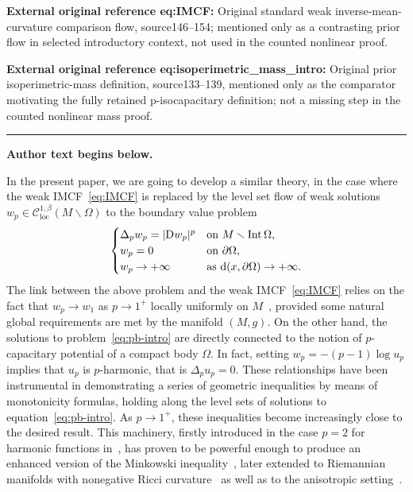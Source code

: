 \documentclass[11pt]{article}
\numberwithin{equation}{section}
\newcommand{\dist}{\mathrm{d}}
\newcommand{\D}{\mathrm{D}\kern.01cm}
\newcommand{\CS}{\mathscr{C}}
\DeclareMathOperator{\Int}{Int}
\DeclareMathOperator{\loc}{loc}
\DeclarePairedDelimiter{\sigmaAbs}{\lvert}{\rvert}
\newcommand{\abs}[1]{\ifstrempty{#1}{\sigmaAbs{\kern1pt\cdot\kern1pt}}{\mathchoice{\sigmaAbs*{#1}}{\sigmaAbs{#1}}{\sigmaAbs{#1}}{\sigmaAbs{#1}}}}
\numberwithin{equation}{section}
\newcounter{case}
\begin{document}
\noindent\textbf{External original reference eq:IMCF:} Original standard weak inverse-mean-curvature comparison flow, source146–154; mentioned only as a contrasting prior flow in selected introductory context, not used in the counted nonlinear proof.\par
\noindent\textbf{External original reference eq:isoperimetric\_mass\_intro:} Original prior isoperimetric-mass definition, source133–139, mentioned only as the comparator motivating the fully retained p-isocapacitary definition; not a missing step in the counted nonlinear mass proof.\par
\medskip\hrule\medskip\noindent\textbf{Author text begins below.}\par
\setcounter{section}{1}\setcounter{equation}{2}
In the present paper, we are going to develop a similar theory, in the case where the weak IMCF~\eqref{eq:IMCF} is replaced by the level set flow of weak solutions $w_p\in \CS^{1,\beta}_{\loc}(M \smallsetminus \Omega)$ to the boundary value problem
\begin{equation}
\label{eq:pb-intro}
 \begin{cases}
 \Delta_p w_p = \abs{\D w_p}^p &\text{on $M \smallsetminus \Int \Omega$,}\\
 w_p=0 & \text{on $\partial \Omega$,}\\
 w_p\to +\infty & \text{as $\dist(x,\partial \Omega) \to +\infty$.}
 \end{cases}
\end{equation}
The link between the above problem and the weak IMCF~\eqref{eq:IMCF} relies on the fact that $w_p\to w_1$ as $p\to 1^+$ locally uniformly on $M$~\cite{kotschwar_localgradientestimatesharmonic_2009,mari_flowlaplaceapproximationnew_2022, moser_inversemeancurvatureflow_2007,moser_inversemeancurvatureflow_2008}, provided some natural global requirements are met by the manifold $(M, g)$. On the other hand,
the solutions to problem~\eqref{eq:pb-intro} are directly connected to the notion of $p$-capacitary potential of a compact body $\Omega$. In fact, setting $w_p = -(p-1) \log u_p$ implies that $u_p$ is $p$-harmonic, that is $\Delta_p u_p = 0$. These relationships have been instrumental in demonstrating a series of geometric inequalities by means of monotonicity formulas, holding along the level sets of solutions to equation~\eqref{eq:pb-intro}. As $p \to 1^+$, these inequalities become increasingly close to the desired result.
This machinery, firstly introduced in the case $p=2$ for harmonic functions in~\cite{agostiniani_sharpgeometricinequalitiesclosed_2020, agostiniani_monotonicityformulaspotentialtheory_2020}, has proven to be powerful enough to produce an enhanced version of the Minkowski inequality~\cite{agostiniani_minkowskiinequalitiesnonlinearpotential_2022, fogagnolo_geometricaspectscapacitarypotentials_2019}, later extended to Riemannian manifolds with nonegative Ricci curvature~\cite{benatti_minkowskiinequalitycompleteriemannian_2022} as well as to the anisotropic setting~\cite{xia_anisotropiccapacityanisotropicminkowski_2022}.
\end{document}
